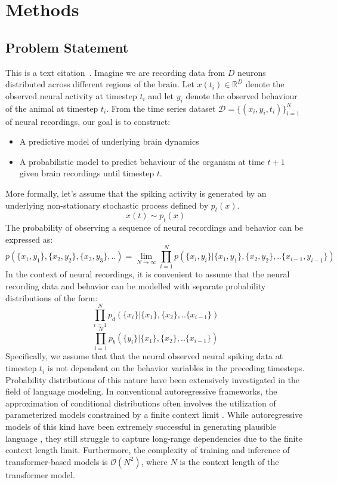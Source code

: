 \chapter{Methods}
\section{Problem Statement}

This is a text citation~\cite{Knight2021}.
Imagine we are recording data from $D$ neurons distributed across different regions of the brain. Let $x(t_i) \in \mathbb{R}^D$ denote the observed neural activity at timestep $t_i$ and let $y_i$ denote the observed behaviour of the animal at timestep $t_i$. From the time series dataset $\mathcal{D} = \{(x_i,y_i,t_i) \}_{i=1}^N$ of neural recordings, our goal is to
construct:
\begin{itemize}
    \item A predictive model of underlying brain dynamics
    \item A probabilistic model to predict behaviour of the organism at time $t+1$ given brain recordings until timestep $t$.
\end{itemize}
More formally, let's assume that the spiking activity is generated by an underlying non-stationary stochastic process defined by $p_t(x)$. 
\begin{equation}
    x(t) \sim p_t(x)
\end{equation}
The probability of observing a sequence of neural recordings and behavior can be expressed as:
\begin{equation}
    p( \{x_1,y_1\},\{x_2,y_2\},\{x_3,y_3\},..) = 
    \lim_{N \to \infty} \prod_{i=1}^{N} p(\{x_{i},y_{i}\}| \{x_1,y_1\},\{x_2,y_2\},..\{x_{i-1},y_{i-1}\})
\end{equation}
In the context of neural recordings, it is convenient to assume that the neural recording data and behavior can be modelled with separate probability distributions of the form:
\begin{equation}
   \prod_{i=1}^{N} p_d(\{x_{i}\}| \{x_1\},\{x_2\},..\{x_{i-1}\})
\end{equation}
\begin{equation}
   \prod_{i=1}^{N} p_b(\{y_{i}\}| \{x_1\},\{x_2\},..\{x_{i-1}\})
\end{equation}
Specifically, we assume that that the neural observed neural spiking data at timestep $t_i$ is not dependent on the behavior variables in the preceding timesteps. Probability distributions of this nature have been extensively investigated in the field of language modeling. In conventional autoregressive frameworks, the approximation of conditional distributions often involves the utilization of parameterized models constrained by a finite context limit \cite{vaswani2017attention}. While autoregressive models of this kind have been extremely successful in generating plausible language \cite{radford2018improving}, they still struggle to capture long-range dependencies due to the finite context length limit\cite{hahn2020theoretical}. Furthermore, the complexity of training and inference of transformer-based models is $\mathcal{O}(N^2)$, where $N$ is the context length of the transformer model.\\




